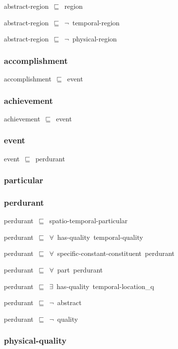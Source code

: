 \documentclass{article}
\begin{document}
abstract-region~\ensuremath{\sqsubseteq}~region~

abstract-region~\ensuremath{\sqsubseteq}~\ensuremath{\lnot}~temporal-region

abstract-region~\ensuremath{\sqsubseteq}~\ensuremath{\lnot}~physical-region

\subsubsection*{accomplishment}

accomplishment~\ensuremath{\sqsubseteq}~event~

\subsubsection*{achievement}

achievement~\ensuremath{\sqsubseteq}~event~

\subsubsection*{event}

event~\ensuremath{\sqsubseteq}~perdurant~

\subsubsection*{particular}

\subsubsection*{perdurant}

perdurant~\ensuremath{\sqsubseteq}~spatio-temporal-particular~

perdurant~\ensuremath{\sqsubseteq}~\ensuremath{\forall}~has-quality~temporal-quality~

perdurant~\ensuremath{\sqsubseteq}~\ensuremath{\forall}~specific-constant-constituent~perdurant~

perdurant~\ensuremath{\sqsubseteq}~\ensuremath{\forall}~part~perdurant~

perdurant~\ensuremath{\sqsubseteq}~\ensuremath{\exists}~has-quality~temporal-location\_q~

perdurant~\ensuremath{\sqsubseteq}~\ensuremath{\lnot}~abstract

perdurant~\ensuremath{\sqsubseteq}~\ensuremath{\lnot}~quality

\subsubsection*{physical-quality}
\end{document}
